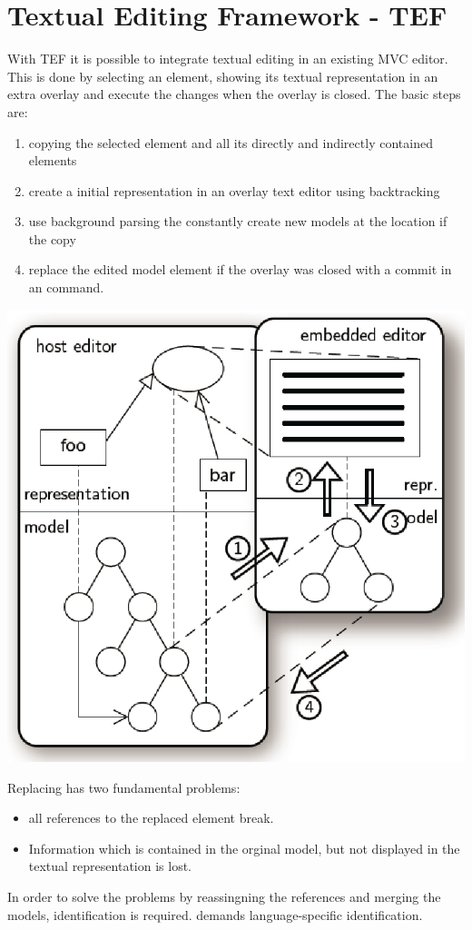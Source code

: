 \chapter{Textual Editing Framework - TEF}
With TEF it is possible to integrate textual editing in an existing MVC editor. This is done by selecting an element, showing its textual representation in an extra overlay and execute the changes when the overlay is closed. 
The basic steps are:
\begin{enumerate}
	\item copying the selected element and all its directly and indirectly contained elements
	\item create a initial representation in an overlay text editor using backtracking
	\item use background parsing the constantly create new models at the location if the copy
	\item replace the edited model element if the overlay was closed with a commit in an command.
\end{enumerate}

\includegraphics[scale=0.7]{gfx/tef.png}

Replacing has two fundamental problems:
\begin{itemize}
	\item all references to the replaced element break.
	\item Information which is contained in the orginal model, but not displayed in the textual representation is lost.
\end{itemize}
In order to solve the problems by reassingning the references and merging the models, identification is required. \cite{TefPaper} demands language-specific identification. 

